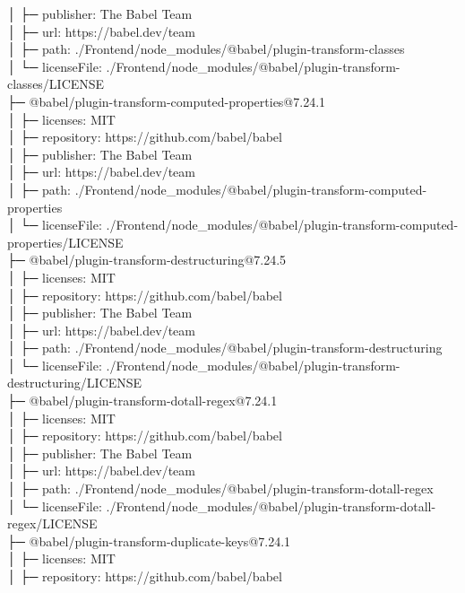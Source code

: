 \documentclass[
    paper=a4,
    twoside=false,
    parskip=half,
    listof=entryprefix,
    listof=totoc,
    index=totoc,
    bibliography=totoc,
    headsepline,
]{scrbook}
\begin{document}
    │  ├─ publisher: The Babel Team\\
    │  ├─ url: https://babel.dev/team\\
    │  ├─ path: ./Frontend/node\_modules/@babel/plugin-transform-classes\\
    │  └─ licenseFile: ./Frontend/node\_modules/@babel/plugin-transform-classes/LICENSE\\
    ├─ @babel/plugin-transform-computed-properties@7.24.1\\
    │  ├─ licenses: MIT\\
    │  ├─ repository: https://github.com/babel/babel\\
    │  ├─ publisher: The Babel Team\\
    │  ├─ url: https://babel.dev/team\\
    │  ├─ path: ./Frontend/node\_modules/@babel/plugin-transform-computed-properties\\
    │  └─ licenseFile: ./Frontend/node\_modules/@babel/plugin-transform-computed-properties/LICENSE\\
    ├─ @babel/plugin-transform-destructuring@7.24.5\\
    │  ├─ licenses: MIT\\
    │  ├─ repository: https://github.com/babel/babel\\
    │  ├─ publisher: The Babel Team\\
    │  ├─ url: https://babel.dev/team\\
    │  ├─ path: ./Frontend/node\_modules/@babel/plugin-transform-destructuring\\
    │  └─ licenseFile: ./Frontend/node\_modules/@babel/plugin-transform-destructuring/LICENSE\\
    ├─ @babel/plugin-transform-dotall-regex@7.24.1\\
    │  ├─ licenses: MIT\\
    │  ├─ repository: https://github.com/babel/babel\\
    │  ├─ publisher: The Babel Team\\
    │  ├─ url: https://babel.dev/team\\
    │  ├─ path: ./Frontend/node\_modules/@babel/plugin-transform-dotall-regex\\
    │  └─ licenseFile: ./Frontend/node\_modules/@babel/plugin-transform-dotall-regex/LICENSE\\
    ├─ @babel/plugin-transform-duplicate-keys@7.24.1\\
    │  ├─ licenses: MIT\\
    │  ├─ repository: https://github.com/babel/babel\\
\end{document}
